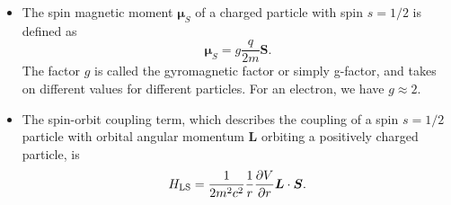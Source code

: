 \documentclass[11pt, a4paper]{article}
\renewcommand{\vec}[1]{\bm{#1}}  %
\renewcommand{\L}{\vec{L}}  %
\renewcommand{\S}{\vec{S}}  %
\newcommand{\m}{\vec{\mu}}  %
\begin{document}
\begin{itemize}
    \item The spin magnetic moment $ \m_{S} $ of a charged particle with spin $ s = 1/2 $ is defined as
	\begin{equation*}
		\m_{S} = g\frac{q}{2m} \S.
	\end{equation*}
    The factor $ g $ is called the gyromagnetic factor or simply g-factor, and takes on different values for different particles. For an electron, we have $ g \approx 2 $. 

    \item The spin-orbit coupling term, which describes the coupling of a spin $ s = 1/2 $ particle with orbital angular momentum $ \L $ orbiting a positively charged particle, is
    \begin{equation*}
        H_{\text{LS}} = \frac{1}{2m^{2}c^{2}}\frac{1}{r}\pdv{V}{r} \L \cdot \S.
    \end{equation*}
    
\end{itemize}
\end{document}
